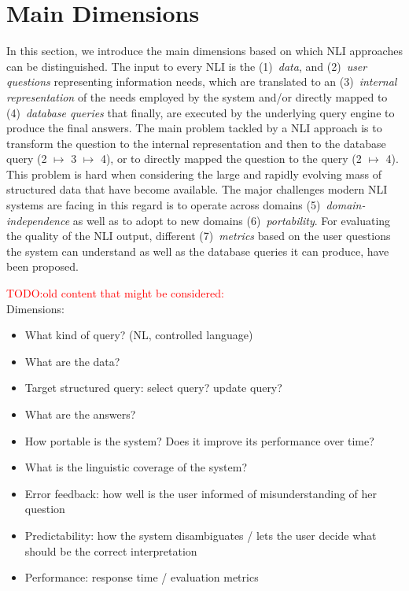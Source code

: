 \documentclass[10pt,journal,letterpaper,compsoc]{IEEEtran}
\newcommand\TODO[1]{{\textcolor{red}{TODO:#1\\}}}
\begin{document}
\section{Main Dimensions}
\label{sec:main-dimensions}
In this section, we introduce the main dimensions based on which NLI approaches
can be distinguished. The input to every NLI is the (1)~\emph{data}, and
(2)~\emph{user questions} representing information needs, which are translated
to an (3)~\emph{internal representation} of the needs employed by the system
and/or directly mapped to (4)~\emph{database queries} that finally, are
executed by the underlying query engine to produce the final answers. The main
problem tackled by a NLI approach is to transform the question to the internal
representation and then to the database query (2 $\mapsto$ 3 $\mapsto$ 4), or
to directly mapped the question to the query (2 $\mapsto$ 4). This problem is
hard when considering the large and rapidly evolving mass of structured data
that have become available. The major challenges modern NLI systems are facing
in this regard is to operate across domains (5)~\emph{domain-independence} as
well as to adopt to new domains (6)~\emph{portability}. For evaluating the
quality of the NLI output, different (7)~\emph{metrics} based on the user
questions the system can understand as well as the database queries it can
produce, have been proposed.

\TODO{old content that might be considered:} 
Dimensions:
\begin{itemize}
  \item What kind of query? (NL, controlled language)
  \item What are the data? 
  \item Target structured query: select query? update query?
  \item What are the answers?
  \item How portable is the system? Does it improve its performance over time?
  \item What is the linguistic coverage of the system? 
  \item Error feedback: how well is the user informed of misunderstanding of her
  question
  \item Predictability: how the system disambiguates / lets the user decide what
  should be the correct interpretation
  \item Performance: response time / evaluation metrics
\end{itemize}
\end{document}
